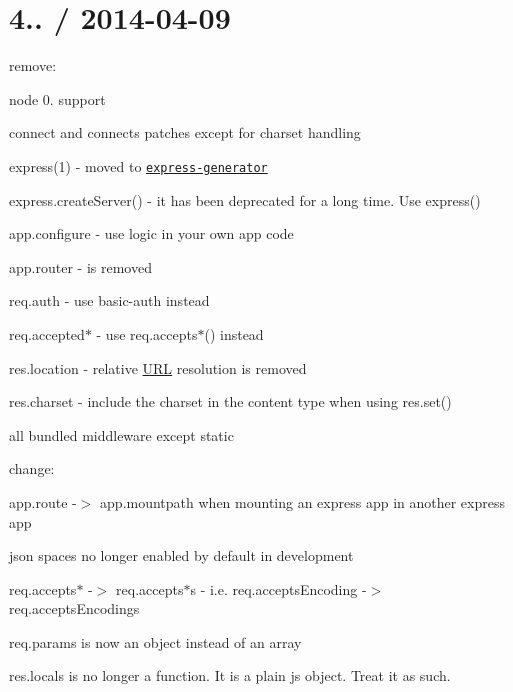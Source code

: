 \section*{4.. / 2014-\/04-\/09 }


\begin{DoxyItemize}
\item remove\+:
\begin{DoxyItemize}
\item node 0. support
\item connect and connect\textquotesingle{}s patches except for charset handling
\item express(1) -\/ moved to \href{https://github.com/expressjs/generator}{\tt express-\/generator}
\item {\ttfamily express.\+create\+Server()} -\/ it has been deprecated for a long time. Use {\ttfamily express()}
\item {\ttfamily app.\+configure} -\/ use logic in your own app code
\item {\ttfamily app.\+router} -\/ is removed
\item {\ttfamily req.\+auth} -\/ use {\ttfamily basic-\/auth} instead
\item {\ttfamily req.\+accepted$\ast$} -\/ use {\ttfamily req.\+accepts$\ast$()} instead
\item {\ttfamily res.\+location} -\/ relative \hyperlink{struct_u_r_l}{U\+R\+L} resolution is removed
\item {\ttfamily res.\+charset} -\/ include the charset in the content type when using {\ttfamily res.\+set()}
\item all bundled middleware except {\ttfamily static}
\end{DoxyItemize}
\item change\+:
\begin{DoxyItemize}
\item {\ttfamily app.\+route} -\/$>$ {\ttfamily app.\+mountpath} when mounting an express app in another express app
\item {\ttfamily json spaces} no longer enabled by default in development
\item {\ttfamily req.\+accepts$\ast$} -\/$>$ {\ttfamily req.\+accepts$\ast$s} -\/ i.\+e. {\ttfamily req.\+accepts\+Encoding} -\/$>$ {\ttfamily req.\+accepts\+Encodings}
\item {\ttfamily req.\+params} is now an object instead of an array
\item {\ttfamily res.\+locals} is no longer a function. It is a plain js object. Treat it as such.

\end{DoxyItemize}
\end{DoxyItemize}
